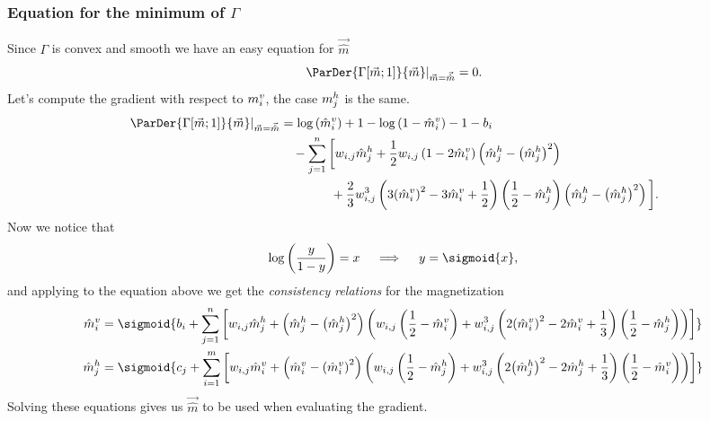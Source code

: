 \subsubsection{Equation for the minimum of \(\Gamma\)}
Since \(\Gamma\) is convex and smooth we have an easy equation for \(\vec{\hat{m}}\)
\[
  \left.\ParDer{\Gam{\vec{m}}{1}}{\vec{m}}\right|_{\vec{m}=\vec{\hat{m}}}=0.
\]
Let's compute the gradient with respect to \(m_i^v\), the case \(m_j^h\) is  the same.
\begin{align*}
  \left.\ParDer{\Gam{\vec{m}}{1}}{\vec{m}}\right|_{\vec{m}=\vec{\hat{m}}}
    &= \log\left(\hmvi\right) + 1 - \log\left(1-\hmvi\right) - 1 - b_i \\
    &\quad-\sum_{j=1}^n\bigg[w_{i,j}\hmhj
      +\frac{1}{2}w_{i,j}\left(1-2\hmvi\right)\left(\hmhj-\hmhjsq\right) \\
      &\qquad\qquad+\frac{2}{3}w_{i,j}^3\left(3\hmvisq-3\hmvi+\frac{1}{2}\right)\left(\frac{1}{2}-\hmhj\right)
      \left(\hmhj-\hmhjsq\right)\bigg].
\end{align*}
Now we notice that
\[
  \log{\left(\frac{y}{1-y}\right)} = x \quad \implies \quad y = \sigmoid{x},
\]
and  applying to the equation above we get the \emph{consistency relations} for the magnetization
\begin{align}
  \hmvi&=\sigmoid{b_i + \sum_{j=1}^n\left[w_{i,j}\hmhj+
           \left(\hmhj-\hmhjsq\right)\left(w_{i,j}\left(\frac{1}{2}-\hmvi\right)
           +w_{i,j}^3\left(2\hmvisq-2\hmvi+\frac{1}{3}\right)\left(\frac{1}{2}-\hmhj\right)
           \right)\right]}\\
  \hmhj&=\sigmoid{c_j + \sum_{i=1}^m\left[w_{i,j}\hmvi+
           \left(\hmvi-\hmvisq\right)\left(w_{i,j}\left(\frac{1}{2}-\hmhj\right)
           +w_{i,j}^3\left(2\hmhjsq-2\hmhj+\frac{1}{3}\right)\left(\frac{1}{2}-\hmvi\right)
           \right)\right]}
\end{align}
Solving these equations gives us \(\vec{\hat{m}}\) to be used when evaluating the gradient.

